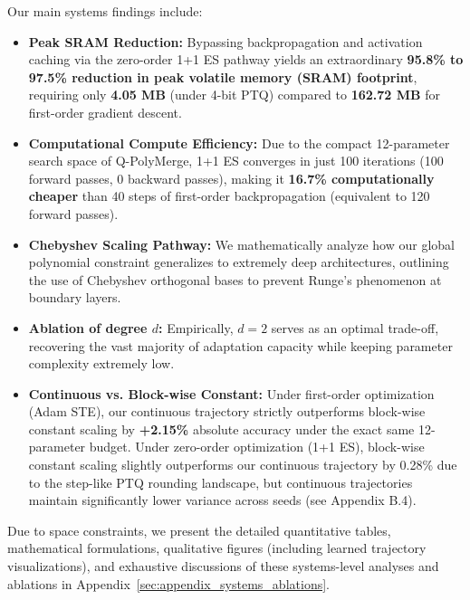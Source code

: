Our main systems findings include:
\begin{itemize}
    \item \textbf{Peak SRAM Reduction:} Bypassing backpropagation and activation caching via the zero-order 1+1 ES pathway yields an extraordinary \textbf{95.8\% to 97.5\% reduction in peak volatile memory (SRAM) footprint}, requiring only \textbf{4.05 MB} (under 4-bit PTQ) compared to \textbf{162.72 MB} for first-order gradient descent.
    \item \textbf{Computational Compute Efficiency:} Due to the compact 12-parameter search space of Q-PolyMerge, 1+1 ES converges in just 100 iterations (100 forward passes, 0 backward passes), making it \textbf{16.7\% computationally cheaper} than 40 steps of first-order backpropagation (equivalent to 120 forward passes).
    \item \textbf{Chebyshev Scaling Pathway:} We mathematically analyze how our global polynomial constraint generalizes to extremely deep architectures, outlining the use of Chebyshev orthogonal bases to prevent Runge's phenomenon at boundary layers.
    \item \textbf{Ablation of degree $d$:} Empirically, $d=2$ serves as an optimal trade-off, recovering the vast majority of adaptation capacity while keeping parameter complexity extremely low.
    \item \textbf{Continuous vs. Block-wise Constant:} Under first-order optimization (Adam STE), our continuous trajectory strictly outperforms block-wise constant scaling by \textbf{+2.15\%} absolute accuracy under the exact same 12-parameter budget. Under zero-order optimization (1+1 ES), block-wise constant scaling slightly outperforms our continuous trajectory by 0.28\% due to the step-like PTQ rounding landscape, but continuous trajectories maintain significantly lower variance across seeds (see Appendix B.4).
\end{itemize}
Due to space constraints, we present the detailed quantitative tables, mathematical formulations, qualitative figures (including learned trajectory visualizations), and exhaustive discussions of these systems-level analyses and ablations in Appendix~\ref{sec:appendix_systems_ablations}.